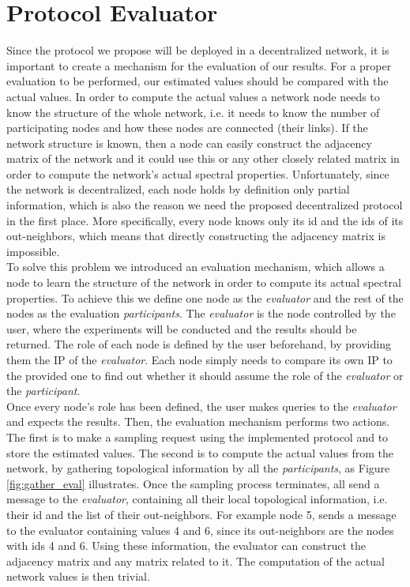 \documentclass[a4paper,11pt,twoside]{report}
\begin{document}
\section{Protocol Evaluator}
\label{sec:evaluator}

Since the protocol we propose will be deployed in a decentralized network, it is important to create a mechanism for the evaluation of our results. For a proper evaluation to be performed, our estimated values should be compared with the actual values. In order to compute the actual values a network node needs to know the structure of the whole network, i.e. it needs to know the number of participating nodes and how these nodes are connected (their links). If the network structure is known, then a node can easily construct the adjacency matrix of the network and it could use this or any other closely related matrix in order to compute the network's actual spectral properties. Unfortunately, since the network is decentralized, each node holds by definition only partial information, which is also the reason we need the proposed decentralized protocol in the first place. More specifically, every node knows only its id and the ids of its out-neighbors, which means that directly constructing the adjacency matrix is impossible.\\

To solve this problem we introduced an evaluation mechanism, which allows a node to learn the structure of the network in order to compute its actual spectral properties. To achieve this we define one node as the \textit{evaluator} and the rest of the nodes as the evaluation \textit{participants}. The \textit{evaluator} is the node controlled by the user, where the experiments will be conducted and the results should be returned. The role of each node is defined by the user beforehand, by providing them the IP of the \textit{evaluator}. Each node simply needs to compare its own IP to the provided one to find out whether it should assume the role of the \textit{evaluator} or the \textit{participant}.\\

Once every node's role has been defined, the user makes queries to the \textit{evaluator} and expects the results. Then, the evaluation mechanism performs two actions. The first is to make a sampling request using the implemented protocol and to store the estimated values. The second is to compute the actual values from the network, by gathering topological information by all the \textit{participants}, as Figure \ref{fig:gather_eval} illustrates. Once the sampling process terminates, all  send a message to the \textit{evaluator}, containing all their local topological information, i.e. their id and the list of their out-neighbors. For example node 5, sends a message to the evaluator containing values 4 and 6, since its out-neighbors are the nodes with ids 4 and 6. Using these information, the evaluator can construct the adjacency matrix and any matrix related to it. The computation of the actual network values is then trivial. \\
\end{document}
